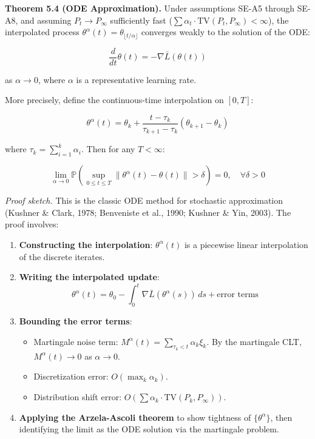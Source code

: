 \documentclass[
  12pt,
]{article}
\providecommand{\tightlist}{%
  \setlength{\itemsep}{0pt}\setlength{\parskip}{0pt}}
\begin{document}
\textbf{Theorem 5.4 (ODE Approximation).} Under assumptions SE-A5
through SE-A8, and assuming \(P_t \to P_\infty\) sufficiently fast
(\(\sum \alpha_t \cdot \text{TV}(P_t, P_\infty) < \infty\)), the
interpolated process
\(\theta^{\alpha}(t) = \theta_{\lfloor t/\alpha \rfloor}\) converges
weakly to the solution of the ODE:

\[
\frac{d}{dt} \theta(t) = -\nabla \bar{L}(\theta(t))
\]

as \(\alpha \to 0\), where \(\alpha\) is a representative learning rate.

More precisely, define the continuous-time interpolation on \([0, T]\):

\[
\theta^{\alpha}(t) = \theta_k + \frac{t - \tau_k}{\tau_{k+1} - \tau_k} (\theta_{k+1} - \theta_k)
\]

where \(\tau_k = \sum_{i=1}^k \alpha_i\). Then for any \(T < \infty\):

\[
\lim_{\alpha \to 0} \mathbb{P}\left( \sup_{0 \leq t \leq T} \|\theta^{\alpha}(t) - \theta(t)\| > \delta \right) = 0, \quad \forall \delta > 0
\]

\emph{Proof sketch.} This is the classic ODE method for stochastic
approximation (Kushner \& Clark, 1978; Benveniste et al., 1990; Kushner
\& Yin, 2003). The proof involves:

\begin{enumerate}
\def\labelenumi{\arabic{enumi}.}
\item
  \textbf{Constructing the interpolation}: \(\theta^{\alpha}(t)\) is a
  piecewise linear interpolation of the discrete iterates.
\item
  \textbf{Writing the interpolated update}: \[
  \theta^{\alpha}(t) = \theta_0 - \int_0^t \nabla \bar{L}(\theta^{\alpha}(s)) \, ds + \text{error terms}
  \]
\item
  \textbf{Bounding the error terms}:

  \begin{itemize}
  \tightlist
  \item
    Martingale noise term:
    \(M^{\alpha}(t) = \sum_{\tau_k < t} \alpha_k \xi_k\). By the
    martingale CLT, \(M^{\alpha}(t) \to 0\) as \(\alpha \to 0\).
  \item
    Discretization error: \(O(\max_k \alpha_k)\).
  \item
    Distribution shift error:
    \(O(\sum \alpha_k \cdot \text{TV}(P_k, P_\infty))\).
  \end{itemize}
\item
  \textbf{Applying the Arzela-Ascoli theorem} to show tightness of
  \(\{\theta^{\alpha}\}\), then identifying the limit as the ODE
  solution via the martingale problem.
\end{enumerate}
\end{document}
